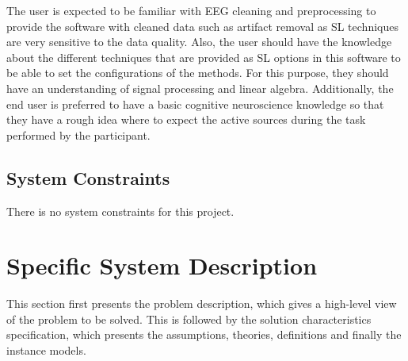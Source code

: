 \documentclass[12pt]{article}
\renewcommand{\progname}{EEGSourceLocalization}
\begin{document}
The user is expected to be familiar with EEG cleaning and preprocessing to provide the software with cleaned data such as artifact removal as SL techniques are very sensitive to the data quality. Also, the user should have the knowledge about the different techniques that are provided as SL options in this software to be able to set the configurations of the methods. For this purpose, they should have an understanding of signal processing and linear algebra. Additionally, the end user is preferred to have a basic cognitive neuroscience knowledge so that they have a rough idea where  to expect the active sources during the task performed by the participant.


\subsection{System Constraints}

There is no system constraints for this project.



\newpage 
\section{Specific System Description}

This section first presents the problem description, which gives a high-level
view of the problem to be solved.  This is followed by the solution characteristics
specification, which presents the assumptions, theories, definitions and finally
the instance models.  
\end{document}
